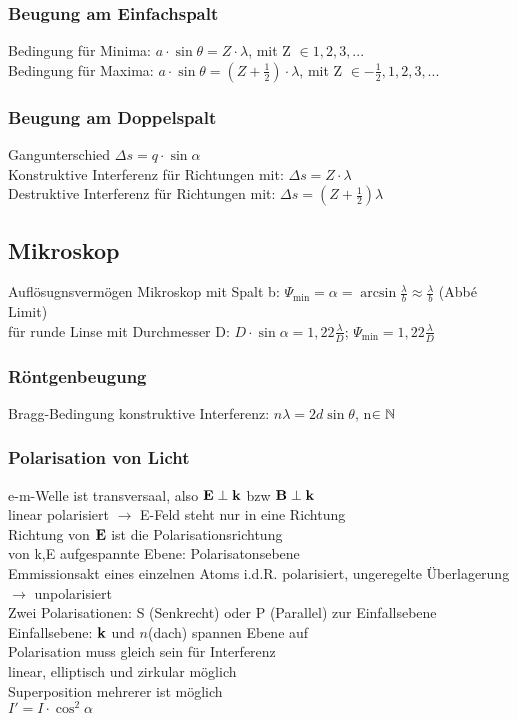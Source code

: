 \documentclass[fs, footer]{latex4ei}
\begin{document}
\begin{multicols*}{4}
\subsubsection{Beugung am Einfachspalt}
Bedingung für Minima: $a\!\cdot\!\sin\theta = Z\cdot\lambda$, mit Z $\in 1,2,3,...$\\ %
Bedingung für Maxima: $a\cdot\sin\theta = (Z+\frac{1}{2})\cdot\lambda$, mit Z $\in -\frac{1}{2},1,2,3,...$\\%
\subsubsection{Beugung am Doppelspalt}
Gangunterschied $\Delta s = q\cdot\sin\alpha$\\
Konstruktive Interferenz für Richtungen mit: $\Delta s = Z \cdot \lambda$\\
Destruktive Interferenz für Richtungen mit: $\Delta s = (Z+\frac{1}{2})\lambda$\\
\subsection{Mikroskop}
Auflösugnsvermögen Mikroskop mit Spalt b: $\Psi_{\text{min}} = \alpha = \arcsin\frac{\lambda}{b} \approx \frac{\lambda}{b}$ (Abbé Limit)\\
für runde Linse mit Durchmesser D: $D\cdot\sin\alpha = 1,22\frac{\lambda}{D}$; $\Psi_{\text{min}} = 1,22\frac{\lambda}{D}$\\
\subsubsection{Röntgenbeugung}
Bragg-Bedingung konstruktive Interferenz: $n\lambda = 2d\sin\theta $, n$\in \mathbb{N} $\\
\subsubsection{Polarisation von Licht}
e-m-Welle ist transversaal, also $\textbf{E} \perp \textbf{k}$ bzw $\textbf{B}\perp\textbf{k}$\\
linear polarisiert $\rightarrow$ E-Feld steht nur in eine Richtung\\
Richtung von $\textbf{E}$ ist die Polarisationsrichtung\\
von k,E aufgespannte Ebene: Polarisatonsebene\\
Emmissionsakt eines einzelnen Atoms i.d.R. polarisiert, ungeregelte Überlagerung $\rightarrow$ unpolarisiert\\
Zwei Polarisationen:
S (Senkrecht) oder P (Parallel) zur Einfallsebene\\
Einfallsebene: $\textbf{k}$ und $n$(dach) spannen Ebene auf\\
Polarisation muss gleich sein für Interferenz\\
linear, elliptisch und zirkular möglich\\
Superposition mehrerer ist möglich\\
$I' = I\cdot\cos ^2\alpha$\\






\end{multicols*}
\end{document}
